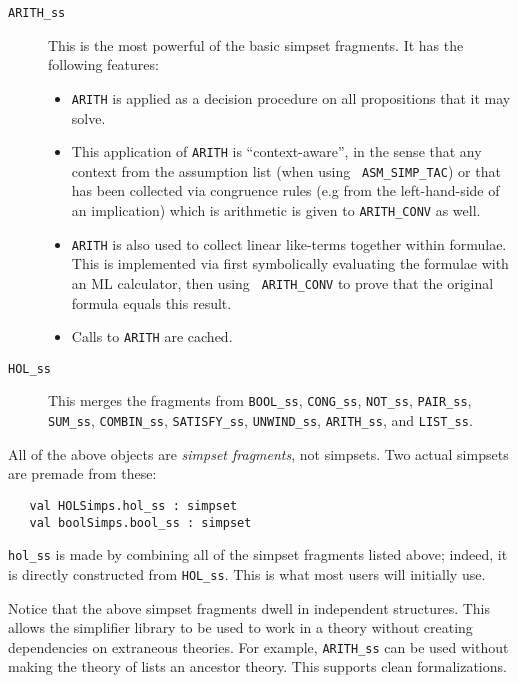 \documentclass[a4]{article}
\begin{document}
\begin{description}
\item[{\tt ARITH\_ss}] This is the most powerful of the basic
  simpset fragments.  It has the following features:
  \begin{itemize}
  \item {\tt ARITH} is applied as a decision procedure
    on all propositions that it may solve.
  \item This application of {\tt ARITH} is ``context-aware'', in the
    sense that any context from the assumption list (when using {\tt
      ASM\_SIMP\_TAC}) or that has been collected via congruence rules
    (e.g from the left-hand-side of an implication) which is
    arithmetic is given to {\tt ARITH\_CONV} as well.
  \item {\tt ARITH} is also used to collect linear like-terms together
    within formulae.  This is implemented via first symbolically
    evaluating the formulae with an ML calculator, then using {\tt
      ARITH\_CONV} to prove that the original formula equals this
    result.
  \item Calls to {\tt ARITH} are cached.
  \end{itemize}

\item[{\tt HOL\_ss}] This merges the fragments from {\tt BOOL\_ss},
  {\tt CONG\_ss}, {\tt NOT\_ss}, {\tt PAIR\_ss},
  {\tt SUM\_ss}, {\tt COMBIN\_ss}, {\tt SATISFY\_ss},
  {\tt UNWIND\_ss}, {\tt ARITH\_ss}, and {\tt LIST\_ss}.
\end{description}

All of the above objects are {\em simpset fragments}, not simpsets.
Two actual simpsets are premade from these:
\begin{boxed} \begin{verbatim}
   val HOLSimps.hol_ss : simpset
   val boolSimps.bool_ss : simpset
\end{verbatim} \end{boxed}
{\tt hol\_ss} is made by combining all of the simpset fragments listed
above; indeed, it is directly constructed from {\tt HOL\_ss}.  This is
what most users will initially use.


Notice that the above simpset fragments dwell in independent
structures. This allows the simplifier library to be used to work in a
theory without creating dependencies on extraneous theories. For
example, {\tt ARITH\_ss} can be used without making the theory of lists
an ancestor theory. This supports clean formalizations.
\end{document}
